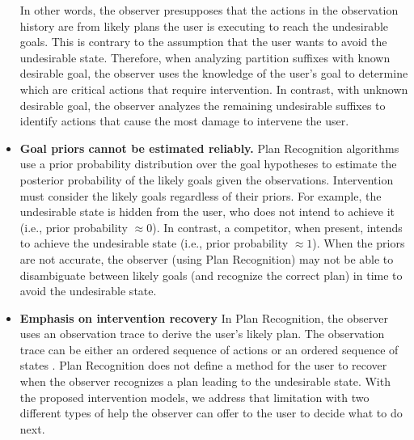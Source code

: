 \begin{itemize}
In other words, the observer presupposes that the actions in the observation history are from likely plans the user is executing to reach the undesirable goals. 
This is contrary to the assumption that the user wants to avoid the undesirable state.
Therefore, when analyzing partition suffixes with known desirable goal, the observer uses the knowledge of the user's goal to determine which are critical actions that require intervention.   
In contrast, with unknown desirable goal, the observer analyzes the remaining undesirable suffixes to identify actions that cause the most damage to intervene the user.
\item \textbf{Goal priors cannot be estimated reliably.}  
Plan Recognition algorithms use a prior probability distribution over the goal hypotheses to estimate the posterior probability of the likely goals given the observations. 
Intervention must consider the likely goals regardless of their priors. 
For example, the undesirable state is hidden from the user, who does not intend to achieve it (i.e., prior probability $\approx 0$). 
In contrast, a competitor, when present, intends to achieve the undesirable state (i.e., prior probability $\approx 1$).
When the priors are not accurate, the observer (using Plan Recognition) may not be able to  disambiguate between likely goals (and recognize the correct plan) in time to avoid the undesirable state.
  
\item \textbf{Emphasis on intervention recovery}
In Plan Recognition, the observer uses an observation trace to derive the user's likely plan. 
The observation trace can be either an ordered sequence of actions  \cite{ramirez2009plan,ramirez2010probabilistic} or an ordered sequence of states \cite{sohrabi2016plan}.
Plan Recognition does not define a method for the user to recover when the observer recognizes a plan leading to the undesirable state. 
With the proposed intervention models, we address that limitation with two different types of help the observer can offer to the user to decide what to do next.
\end{itemize}



